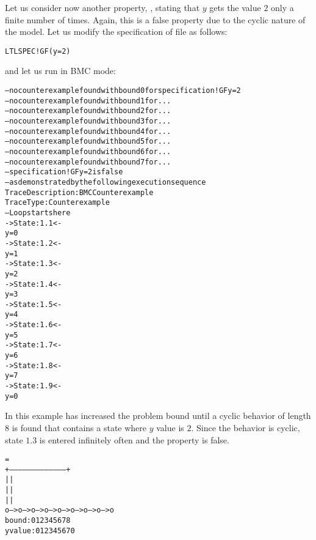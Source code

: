Let us consider now another property, , stating that
$y$ gets the value $2$ only a finite number of times. Again, this is a false
property due to the cyclic nature of the model. Let us modify the
specification of file  as follows:
\begin{alltt}
LTLSPEC !G F (y = 2)
\end{alltt}
and let us run \nusmv in BMC mode:
\begin{alltt}
\shellprompt {}
-- no counterexample found with bound 0 for specification ! G  F y = 2
-- no counterexample found with bound 1 for ...
-- no counterexample found with bound 2 for ...
-- no counterexample found with bound 3 for ...
-- no counterexample found with bound 4 for ...
-- no counterexample found with bound 5 for ...
-- no counterexample found with bound 6 for ...
-- no counterexample found with bound 7 for ...
-- specification ! G  F y = 2   is false
-- as demonstrated by the following execution sequence
Trace Description: BMC Counterexample
Trace Type: Counterexample
-- Loop starts here
-> State: 1.1 <-
  y = 0
-> State: 1.2 <-
  y = 1
-> State: 1.3 <-
  y = 2
-> State: 1.4 <-
  y = 3
-> State: 1.5 <-
  y = 4
-> State: 1.6 <-
  y = 5
-> State: 1.7 <-
  y = 6
-> State: 1.8 <-
  y = 7
-> State: 1.9 <-
  y = 0
\shellprompt
\end{alltt}
In this example \nusmv has increased the problem bound until a
cyclic behavior of length 8 is found that contains a state where $y$ value
is $2$. Since the behavior is cyclic, state $1.3$ is entered infinitely
often and the property is false.
\begin{alltt}
                             =
         +---------------------------------------+
         |                                       |
         |                                       |
         |                                       |
         o--->o--->o--->o--->o--->o--->o--->o--->o
bound:   0    1    2    3    4    5    6    7    8
y value: 0    1    2    3    4    5    6    7    0
\end{alltt}


